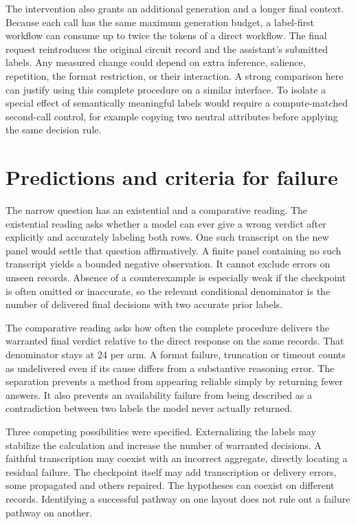 \documentclass[12pt,letterpaper]{article}
\begin{document}
The intervention also grants an additional generation and a longer final context. Because each call has the same maximum generation budget, a label-first workflow can consume up to twice the tokens of a direct workflow. The final request reintroduces the original circuit record and the assistant's submitted labels. Any measured change could depend on extra inference, salience, repetition, the format restriction, or their interaction. A strong comparison here can justify using this complete procedure on a similar interface. To isolate a special effect of semantically meaningful labels would require a compute-matched second-call control, for example copying two neutral attributes before applying the same decision rule.

\section{Predictions and criteria for failure}
The narrow question has an existential and a comparative reading. The existential reading asks whether a model can ever give a wrong verdict after explicitly and accurately labeling both rows. One such transcript on the new panel would settle that question affirmatively. A finite panel containing no such transcript yields a bounded negative observation. It cannot exclude errors on unseen records. Absence of a counterexample is especially weak if the checkpoint is often omitted or inaccurate, so the relevant conditional denominator is the number of delivered final decisions with two accurate prior labels.

The comparative reading asks how often the complete procedure delivers the warranted final verdict relative to the direct response on the same records. That denominator stays at 24 per arm. A format failure, truncation or timeout counts as undelivered even if its cause differs from a substantive reasoning error. The separation prevents a method from appearing reliable simply by returning fewer answers. It also prevents an availability failure from being described as a contradiction between two labels the model never actually returned.

Three competing possibilities were specified. Externalizing the labels may stabilize the calculation and increase the number of warranted decisions. A faithful transcription may coexist with an incorrect aggregate, directly locating a residual failure. The checkpoint itself may add transcription or delivery errors, some propagated and others repaired. The hypotheses can coexist on different records. Identifying a successful pathway on one layout does not rule out a failure pathway on another.
\end{document}
